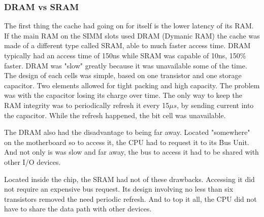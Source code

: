 \subsubsection{DRAM vs SRAM}
The first thing the cache had going on for itself is the lower latency of its RAM. If the main RAM on the SIMM slots used DRAM (Dymanic RAM) the cache was made of a different type called SRAM, able to  much faster access time. DRAM typically had an access time of 150ns while SRAM was capable of 10ns, 150\% faster. DRAM was "slow" greatly because it was unavailable some of the time. The design of each cells was simple, based on one transistor and one storage capacitor. Two elements allowed for tight packing and high capacity. The problem was with the capacitor losing its charge over time. The only way to keep the RAM integrity was to periodically refresh it every 15$\mu s$, by sending current into the capacitor. While the refresh happened, the bit cell was unavailable.\\
\par
{}
The DRAM also had the disadvantage to being far away. Located "somewhere" on the motherboard so to access it, the CPU had to request it to its Bus Unit. And not only is was slow and far away, the bus to access it had to be shared with other I/O devices.\\
\par
{}
\par
Located inside the chip, the SRAM had not of these drawbacks. Accessing it did not require an expensive bus request. Its design involving no less than six transistors removed the need periodic refresh. And to top it all, the CPU did not have to share the data path with other devices.
\par











